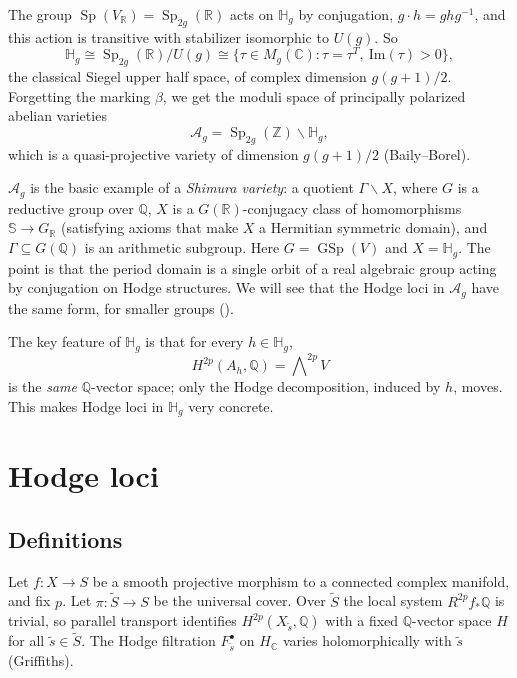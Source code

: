 \documentclass[12pt]{amsart}
\newcommand{\R}{\mathbb{R}}
\newcommand{\Q}{\mathbb{Q}}
\newcommand{\C}{\mathbb{C}}
\newcommand{\Z}{\mathbb{Z}}
\newcommand{\Del}{\mathbb{S}}
\DeclareMathOperator{\Sp}{Sp}
\DeclareMathOperator{\GSp}{GSp}
\newcommand{\cA}{\mathcal{A}}
\newcommand{\HH}{\mathbb{H}}
\newcommand{\wt}{\widetilde}
\let\oldbigwedge\bigwedge
\renewcommand{\bigwedge}{\mathop{\textstyle\oldbigwedge}\nolimits}
\theoremstyle{definition}
\theoremstyle{remark}
\numberwithin{equation}{section}
\begin{document}
The group $\Sp(V_\R) = \Sp_{2g}(\R)$ acts on $\HH_g$ by conjugation,
$g \cdot h = g h g^{-1}$, and this action is transitive with stabilizer
isomorphic to $U(g)$. So
\begin{equation*}
    \HH_g \cong \Sp_{2g}(\R)/U(g) \cong
    \{\tau \in M_g(\C) : \tau = \tau^T, \ \mathrm{Im}(\tau) > 0\},
\end{equation*}
the classical Siegel upper half space, of complex dimension $g(g+1)/2$.
Forgetting the marking $\beta$, we get the moduli space of principally polarized
abelian varieties
\begin{equation*}
    \cA_g = \Sp_{2g}(\Z) \backslash \HH_g,
\end{equation*}
which is a quasi-projective variety of dimension $g(g+1)/2$ (Baily--Borel).

\begin{remark}
    $\cA_g$ is the basic example of a \emph{Shimura variety}: a quotient
    $\Gamma \backslash X$, where $G$ is a reductive group over $\Q$, $X$ is a
    $G(\R)$-conjugacy class of homomorphisms $\Del \to G_\R$ (satisfying axioms
    that make $X$ a Hermitian symmetric domain), and $\Gamma \subseteq G(\Q)$
    is an arithmetic subgroup. Here $G = \GSp(V)$ and $X = \HH_g$. The point
    is that the period domain is a single orbit of a real algebraic group
    acting by conjugation on Hodge structures. We will see that the Hodge loci
    in $\cA_g$ have the same form, for smaller groups
    ().
\end{remark}

The key feature of $\HH_g$ is that for every $h \in \HH_g$,
\begin{equation*}
    H^{2p}(A_h, \Q) = \bigwedge^{2p} V
\end{equation*}
is the \emph{same} $\Q$-vector space; only the Hodge decomposition, induced by
$h$, moves. This makes Hodge loci in $\HH_g$ very concrete.

\section{Hodge loci}\label{sec:hodge-loci}

\subsection{Definitions}
Let $f \colon X \to S$ be a smooth projective morphism to a connected complex
manifold, and fix $p$. Let $\pi \colon \wt{S} \to S$ be the universal cover.
Over $\wt{S}$ the local system $R^{2p}f_*\Q$ is trivial, so parallel transport
identifies $H^{2p}(X_{\tilde{s}}, \Q)$ with a fixed $\Q$-vector space $H$ for
all $\tilde{s} \in \wt{S}$. The Hodge filtration $F^\bullet_{\tilde{s}}$ on
$H_\C$ varies holomorphically with $\tilde{s}$ (Griffiths).
\end{document}
